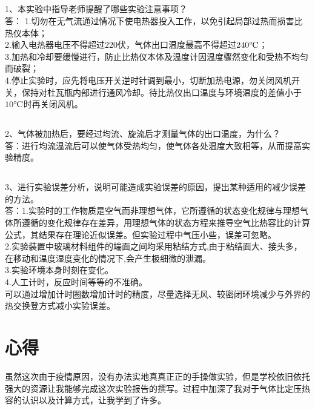 \documentclass[UTF8,a4paper,10pt]{ctexart}
\def \celsius{\ensuremath{^\circ\hspace{-0.09em}\mathrm{C}}}
\begin{document}
\subsection{}
1、本实验中指导老师提醒了哪些实验注意事项？ \\
答：
1.切勿在无气流通过情况下使电热器投入工作，以免引起局部过热而损害比热仪本体；\\
2.输入电热器电压不得超过220伏，气体出口温度最高不得超过$240\celsius$；\\
3.加热和冷却要缓慢进行，防止比热仪本体及温度计因温度骤然变化和受热不均匀而破裂；\\
4.停止实验时，应先将电压开关逆时针调到最小，切断加热电源，勿关闭风机开关，保持对杜瓦瓶内部进行通风冷却。待比热仪出口温度与环境温度的差值小于$10\celsius$时再关闭风机。
\subsection{}
2、气体被加热后，要经过均流、旋流后才测量气体的出口温度，为什么？ \\
答：进行均流温流后可以使气体受热均匀，使气体各处温度大致相等，从而提高实验精度。

\subsection{}
3、进行实验误差分析，说明可能造成实验误差的原因，提出某种适用的减少误差的方法。\\
答：1.实验时的工作物质是空气而非理想气体，它所遵循的状态变化规律与理想气体所遵循的变化规律存在差异，用理想气体的状态方程来推导空气比热容比的计算公式，其结果存在理论近似误差。但实验过程中气压小些，误差可忽略。\\
2.实验装置中玻璃材料组件的端面之间均采用粘结方式,由于粘结面大、接头多，在移动和温度湿度变化的情况下,会产生极细微的泄漏。\\
3.实验环境本身时刻在变化。\\
4.人工计时，反应时间等等的不准确。\\
可以通过增加计时圈数增加计时的精度，尽量选择无风、较密闭环境减少与外界的热交换登方式减小实验误差。
\section{心得}
虽然这次由于疫情原因，没有办法实地真真正正的手操做实验，但是学校依旧依托强大的资源让我能够完成这次实验报告的撰写。过程中加深了我对于气体比定压热容的认识以及计算方式，让我学到了许多。
\end{document}
